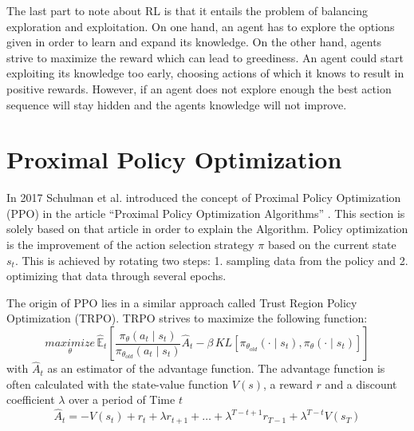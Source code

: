 The last part to note about RL is that it entails the problem of balancing exploration and exploitation. On one hand, an agent has to explore the options given in order to learn and expand its knowledge. On the other hand, agents strive to maximize the reward which can lead to greediness. An agent could start exploiting its knowledge too early,  choosing actions of which it knows to result in positive rewards. However, if an agent does not explore enough the best action sequence will stay hidden and the agents knowledge will not improve.

\section{Proximal Policy Optimization}
In 2017 Schulman et al. introduced the concept of Proximal Policy Optimization (PPO) in
the article ``Proximal Policy Optimization Algorithms'' \cite{scwo17}.
This section is solely based on that article in order to explain the Algorithm.
Policy optimization is the improvement of the action selection strategy $\pi$ based on the current state $s_{t}$. This is achieved by rotating two steps: 1. sampling data from the policy and 2. optimizing that data through several epochs.

The origin of PPO lies in a similar approach called Trust Region Policy Optimization (TRPO). TRPO strives to maximize the following function:
\begin{equation}\label{TRPO}
    \underset{\theta}{maximize}\,\hat{\mathbb{E}}_{t} \left[ \frac{\pi_{\theta}(a_{t} \mid s_{t})}{\pi_{\theta_{old}}(a_{t} \mid s_{t})}
        \hat{A}_{t}-\beta \, KL[\pi_{\theta_{old}}(\cdot \mid s_{t}),\pi_{\theta}(\cdot \mid s_{t})] \right]
\end{equation}
with $\hat{A}_{t}$ as an estimator of the advantage function. The advantage function is often calculated with the state-value function $V(s)$, a reward $r$ and a discount coefficient $\lambda$ over a period of Time $t$
\begin{equation}\label{advantage}
    \hat{A}_{t} = -V(s_{t})+r_{t}+\lambda r_{t+1}+ \ldots + \lambda^{T-t+1} r_{T-1} + \lambda^{T-t} V(s_{T})
\end{equation}

